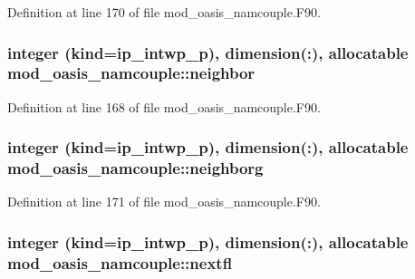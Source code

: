 Definition at line 170 of file mod\+\_\+oasis\+\_\+namcouple.\+F90.

\hypertarget{classmod__oasis__namcouple_a298c9165785ae1a41f89597cadd211e7}{
\subsubsection[{neighbor}]{\setlength{\rightskip}{0pt plus 5cm}integer (kind=ip\+\_\+intwp\+\_\+p), dimension(\+:), allocatable mod\+\_\+oasis\+\_\+namcouple\+::neighbor\hspace{0.3cm}{\ttfamily [private]}}}\label{classmod__oasis__namcouple_a298c9165785ae1a41f89597cadd211e7}


Definition at line 168 of file mod\+\_\+oasis\+\_\+namcouple.\+F90.

\hypertarget{classmod__oasis__namcouple_a883d88938c50264711c53af2b555c3db}{
\subsubsection[{neighborg}]{\setlength{\rightskip}{0pt plus 5cm}integer (kind=ip\+\_\+intwp\+\_\+p), dimension(\+:), allocatable mod\+\_\+oasis\+\_\+namcouple\+::neighborg\hspace{0.3cm}{\ttfamily [private]}}}\label{classmod__oasis__namcouple_a883d88938c50264711c53af2b555c3db}


Definition at line 171 of file mod\+\_\+oasis\+\_\+namcouple.\+F90.

\hypertarget{classmod__oasis__namcouple_a8302411d5a02efd9a6dc7f784fbb0d4d}{
\subsubsection[{nextfl}]{\setlength{\rightskip}{0pt plus 5cm}integer (kind=ip\+\_\+intwp\+\_\+p), dimension(\+:), allocatable mod\+\_\+oasis\+\_\+namcouple\+::nextfl\hspace{0.3cm}{\ttfamily [private]}}}\label{classmod__oasis__namcouple_a8302411d5a02efd9a6dc7f784fbb0d4d}


